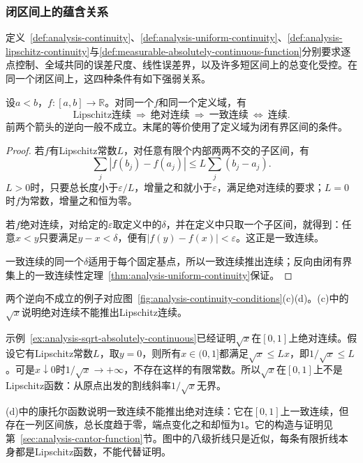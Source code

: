\subsubsection{闭区间上的蕴含关系}
定义~\ref{def:analysis-continuity}、\ref{def:analysis-uniform-continuity}、\ref{def:analysis-lipschitz-continuity}与\ref{def:measurable-absolutely-continuous-function}分别要求逐点控制、全域共同的误差尺度、线性误差界，以及许多短区间上的总变化受控。在同一个闭区间上，这四种条件有如下强弱关系。
\begin{theorem}[闭区间上连续性条件的关系]
\label{thm:analysis-continuity-implications}
设$a<b$，$f:[a,b]\to\mathbb R$。对同一个$f$和同一个定义域，有
\[
 \text{Lipschitz连续}\ \Longrightarrow\ \text{绝对连续}
 \ \Longrightarrow\ \text{一致连续}\ \Longleftrightarrow\ \text{连续}.
\]
前两个箭头的逆向一般不成立。末尾的等价使用了定义域为闭有界区间的条件。
\end{theorem}
\begin{proof}
若$f$有Lipschitz常数$L$，对任意有限个内部两两不交的子区间，有
\[
 \sum_j|f(b_j)-f(a_j)|\leq L\sum_j(b_j-a_j).
\]
$L>0$时，只要总长度小于$\varepsilon/L$，增量之和就小于$\varepsilon$，满足绝对连续的要求；$L=0$时$f$为常数，增量之和恒为零。

若$f$绝对连续，对给定的$\varepsilon$取定义中的$\delta$，并在定义中只取一个子区间，就得到：任意$x<y$只要满足$y-x<\delta$，便有$|f(y)-f(x)|<\varepsilon$。这正是一致连续。

一致连续的同一个$\delta$适用于每个固定基点，所以一致连续推出连续；反向由闭有界集上的一致连续性定理~\ref{thm:analysis-uniform-continuity}保证。
\end{proof}
两个逆向不成立的例子对应图~\ref{fig:analysis-continuity-conditions}(c)(d)。(c)中的$\sqrt x$说明绝对连续不能推出Lipschitz连续。
\begin{example}
\label{ex:analysis-sqrt-not-lipschitz}
示例~\ref{ex:analysis-sqrt-absolutely-continuous}已经证明$\sqrt x$在$[0,1]$上绝对连续。假设它有Lipschitz常数$L$，取$y=0$，则所有$x\in(0,1]$都满足$\sqrt x\leq Lx$，即$1/\sqrt x\leq L$。可是$x\downarrow0$时$1/\sqrt x\to+\infty$，不存在这样的有限常数。所以$\sqrt x$在$[0,1]$上不是Lipschitz函数：从原点出发的割线斜率$1/\sqrt x$无界。
\end{example}
(d)中的康托尔函数说明一致连续不能推出绝对连续：它在$[0,1]$上一致连续，但存在一列区间族，总长度趋于零，端点变化之和却恒为$1$。它的构造与证明见第~\ref{sec:analysis-cantor-function}节。图中的八级折线只是近似，每条有限折线本身都是Lipschitz函数，不能代替证明。

